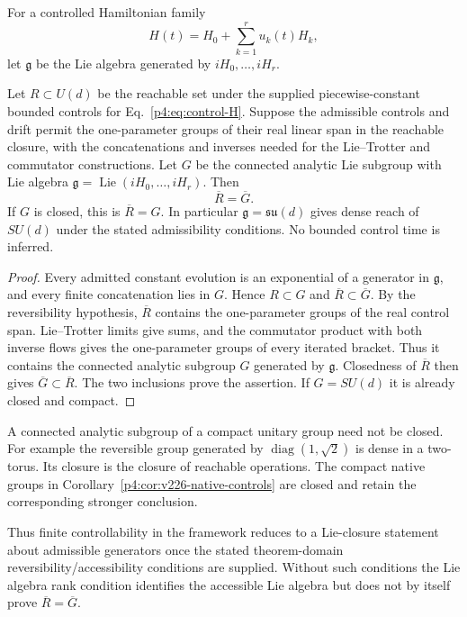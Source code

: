 \documentclass[12pt,a4paper]{article}
\begin{document}
For a controlled Hamiltonian family
\begin{equation}
\label{p4:eq:control-H}
H(t)=H_0+\sum_{k=1}^r u_k(t)H_k,
\end{equation}
let $\mathfrak g$ be the Lie algebra generated by $iH_0,\dots,iH_r$.


\begin{theorem}
\label{p4:thm:lie-closure-controllability}
Let $R\subset U(d)$ be the reachable set under the supplied piecewise-constant
bounded controls for Eq.~\ref{p4:eq:control-H}. Suppose the admissible controls
and drift permit the one-parameter groups of their real linear span in the
reachable closure, with the concatenations and inverses needed for the
Lie--Trotter and commutator constructions. Let $G$ be the connected analytic
Lie subgroup with Lie algebra
$\mathfrak g=\operatorname{Lie}(iH_0,\ldots,iH_r)$. Then
\[
 \overline R=\overline G.
\]
If $G$ is closed, this is $\overline R=G$. In particular
$\mathfrak g=\mathfrak{su}(d)$ gives dense reach of $SU(d)$ under the
stated admissibility conditions. No bounded control time is inferred.
\end{theorem}
\begin{proof}
Every admitted constant evolution is an exponential of a generator in
$\mathfrak g$, and every finite concatenation lies in $G$. Hence
$R\subset G$ and $\overline R\subset\overline G$.
By the reversibility hypothesis, $\overline R$ contains the one-parameter
groups of the real control span. Lie--Trotter limits give sums, and the
commutator product with both inverse flows gives the one-parameter groups
of every iterated bracket. Thus it contains the connected analytic subgroup
$G$ generated by $\mathfrak g$. Closedness of $\overline R$ then gives
$\overline G\subset\overline R$. The two inclusions prove the assertion.
If $G=SU(d)$ it is already closed and compact.
\end{proof}
\begin{remark}
A connected analytic subgroup of a compact unitary group need not be closed.
For example the reversible group generated by
$\operatorname{diag}(1,\sqrt2)$ is dense in a two-torus. Its closure is the
closure of reachable operations. The compact native groups in
Corollary~\ref{p4:cor:v226-native-controls} are closed and retain the
corresponding stronger conclusion.
\end{remark}

Thus finite controllability in the framework reduces to a Lie-closure statement about admissible generators once the stated theorem-domain reversibility/accessibility conditions are supplied. Without such conditions the Lie algebra rank condition identifies the accessible Lie algebra but does not by itself prove $\overline R=\overline G$.
\end{document}
